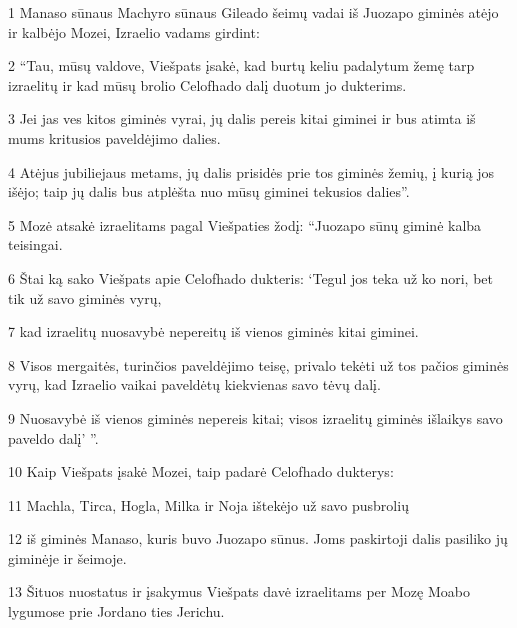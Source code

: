 \par 1 Manaso sūnaus Machyro sūnaus Gileado šeimų vadai iš Juozapo giminės atėjo ir kalbėjo Mozei, Izraelio vadams girdint: 
\par 2 “Tau, mūsų valdove, Viešpats įsakė, kad burtų keliu padalytum žemę tarp izraelitų ir kad mūsų brolio Celofhado dalį duotum jo dukterims. 
\par 3 Jei jas ves kitos giminės vyrai, jų dalis pereis kitai giminei ir bus atimta iš mums kritusios paveldėjimo dalies. 
\par 4 Atėjus jubiliejaus metams, jų dalis prisidės prie tos giminės žemių, į kurią jos išėjo; taip jų dalis bus atplėšta nuo mūsų giminei tekusios dalies”. 
\par 5 Mozė atsakė izraelitams pagal Viešpaties žodį: “Juozapo sūnų giminė kalba teisingai. 
\par 6 Štai ką sako Viešpats apie Celofhado dukteris: ‘Tegul jos teka už ko nori, bet tik už savo giminės vyrų, 
\par 7 kad izraelitų nuosavybė nepereitų iš vienos giminės kitai giminei. 
\par 8 Visos mergaitės, turinčios paveldėjimo teisę, privalo tekėti už tos pačios giminės vyrų, kad Izraelio vaikai paveldėtų kiekvienas savo tėvų dalį. 
\par 9 Nuosavybė iš vienos giminės nepereis kitai; visos izraelitų giminės išlaikys savo paveldo dalį’ ”. 
\par 10 Kaip Viešpats įsakė Mozei, taip padarė Celofhado dukterys: 
\par 11 Machla, Tirca, Hogla, Milka ir Noja ištekėjo už savo pusbrolių 
\par 12 iš giminės Manaso, kuris buvo Juozapo sūnus. Joms paskirtoji dalis pasiliko jų giminėje ir šeimoje. 
\par 13 Šituos nuostatus ir įsakymus Viešpats davė izraelitams per Mozę Moabo lygumose prie Jordano ties Jerichu.


